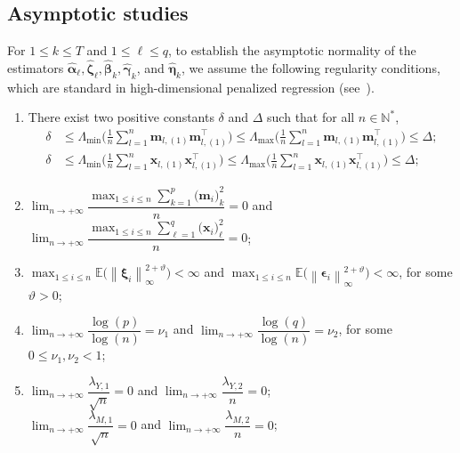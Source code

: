 \documentclass[
  12pt]{article}
\def\E{\mathbb{E}}
\def\M{\mathbf{m}}
\def\N{\mathbb{N}}
\def\X{\mathbf{x}}
\begin{document}
\subsection{Asymptotic studies}
\label{subsec:asymptotic.normality}
For $1 \leq  k  \leq T$ and $1 \leq \ell \leq q$, to establish the asymptotic normality of the estimators   $\widehat{\bm{\alpha}}_{\ell}, \widehat{\bm{\zeta}}_{\ell}, \widehat{\bm{\beta}}_{k}, \widehat{\bm{\gamma}}_{k}$, and $ \widehat{\bm{\eta}}_{k}$, we assume the following regularity conditions, which are standard in high-dimensional penalized regression (see~\cite[Section 3]{Zou-Zhang:2009}).
\begin{enumerate}
	\item[(A1)] There exist two positive constants $\delta$ and $\Delta$ such that for all $n \in \N^{*}$,
	\begin{align*}
		\delta  &\leq  \Lambda_{\min} \Big( \frac{1}{n} \sum_{l = 1}^{n} \M_{l,(1)}  \M_{l,(1)}^{\top} \Big)
		\leq  \Lambda_{\max} \Big( \frac{1}{n}  \sum_{l = 1}^{n} \M_{l,(1)}  \M_{l,(1)}^{\top} \Big)  \leq  \Delta ;
		\\
		\delta  &\leq  \Lambda_{\min} \Big( \frac{1}{n} \sum_{l = 1}^{n} \X_{l,(1)}  \X_{l,(1)}^{\top} \Big)
		\leq  \Lambda_{\max} \Big( \frac{1}{n}  \sum_{l = 1}^{n} \X_{l,(1)}  \X_{l,(1)}^{\top} \Big)  \leq  \Delta ;
	\end{align*}
	\item[(A2)] $\lim_{n   \rightarrow   +\infty} \dfrac{\max_{1 \leq i \leq n} \sum_{k=1}^{p} \big( \M_{i} \big)_{k}^{2} }{ n }  =  0$ and $\lim_{n   \rightarrow   +\infty} \dfrac{\max_{1 \leq i \leq n} \sum_{\ell=1}^{q} \big( \X_{i} \big)_{\ell}^{2} }{ n }  =  0$;
	\item[(A3)] $\max_{1 \leq i \leq n} \E \Big( \left\| \bm{\xi}_{i}  \right\|_{\infty}^{2 + \vartheta}   \Big) < \infty$ and $\max_{1 \leq i \leq n} \E \Big( \left\| \bm{\epsilon}_{i}  \right\|_{\infty}^{2 + \vartheta}   \Big) < \infty$, for some $\vartheta > 0$;
	\item[(A4)] $\lim_{n   \rightarrow   +\infty}  \dfrac{\log(p)}{\log(n)} = \nu_{1}$ and $\lim_{n   \rightarrow   +\infty}  \dfrac{\log(q)}{\log(n)} = \nu_{2}$, for some $0 \leq \nu_{1}, \nu_{2} < 1$;
	\item[(A5)] $\lim_{n   \rightarrow   +\infty}  \dfrac{\lambda_{Y,1}}{ \sqrt{n} } = 0$ and $\lim_{n   \rightarrow   +\infty} \dfrac{\lambda_{Y,2}}{n} = 0$;
	\\
	$\lim_{n   \rightarrow   +\infty}  \dfrac{\lambda_{M,1}}{ \sqrt{n} } = 0$ and $\lim_{n   \rightarrow   +\infty} \dfrac{\lambda_{M,2}}{n} = 0$;

\end{enumerate}
\end{document}
